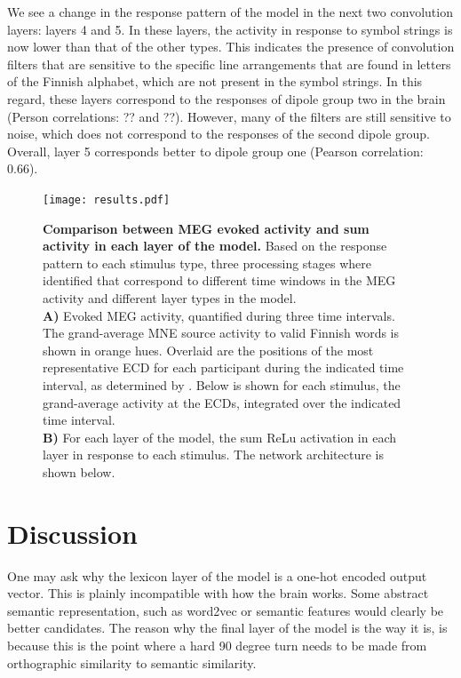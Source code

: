 \documentclass[a4paper, 10pt]{vanvliet_paper}
\begin{document}
We see a change in the response pattern of the model in the next two convolution layers: layers 4 and 5.
In these layers, the activity in response to symbol strings is now lower than that of the other types.
This indicates the presence of convolution filters that are sensitive to the specific line arrangements that are found in letters of the Finnish alphabet, which are not present in the symbol strings.
In this regard, these layers correspond to the responses of dipole group two in the brain (Person correlations: ?? and ??).
However, many of the filters are still sensitive to noise, which does not correspond to the responses of the second dipole group.
Overall, layer 5 corresponds better to dipole group one (Pearson correlation: 0.66).


\begin{figure}
    \texttt{[image: results.pdf]}
    \vspace{2ex}
    \caption{
        \textbf{Comparison between \gls{MEG} evoked activity and sum activity in each layer of the model.}
        Based on the response pattern to each stimulus type, three processing stages where identified that correspond to different time windows in the \gls{MEG} activity and different layer types in the model.\\
        \textbf{A)} Evoked \gls{MEG} activity, quantified during three time intervals.
        The grand-average \gls{MNE} source activity to valid Finnish words is shown in orange hues.
        Overlaid are the positions of the most representative \gls{ECD} for each participant during the indicated time interval, as determined by \textcite{Vartiainen2011}.
        Below is shown for each stimulus, the grand-average activity at the \glspl{ECD}, integrated over the indicated time interval.\\
        \textbf{B)} For each layer of the model, the sum \gls{ReLu} activation in each layer in response to each stimulus.
        The network architecture is shown below.
    }\label{fig:results}
\end{figure}

\section{Discussion}
One may ask why the lexicon layer of the model is a one-hot encoded output vector.
This is plainly incompatible with how the brain works.
Some abstract semantic representation, such as word2vec or semantic features would clearly be better candidates.
The reason why the final layer of the model is the way it is, is because this is the point where a hard 90 degree turn needs to be made from orthographic similarity to semantic similarity.
\end{document}
